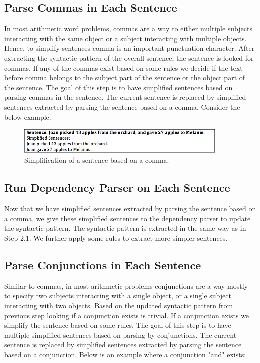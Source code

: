 \documentclass[11pt]{article}
\begin{document}
\subsection{Parse Commas in Each Sentence}
In most arithmetic word problems, commas are a way to either multiple subjects interacting with the same object or a subject interacting with multiple objects. Hence, to simplify sentences comma is an important punctuation character. After extracting the syntactic pattern of the overall sentence, the sentence is looked for commas. If any of the commas exist based on some rules we decide if the text before comma belongs to the subject part of the sentence or the object part of the sentence. The goal of this step is to have simplified sentences based on parsing commas in the sentence. The current sentence is replaced by simplified sentences extracted by parsing the sentence based on a comma. Consider the below example:

\begin{figure}[h]
\includegraphics[width=0.90\textwidth]{Figure3}
\centering
\caption{\label{fig:Figure3}Simplification of a sentence based on a comma.}
\end{figure}

\subsection{Run Dependency Parser on Each Sentence}
Now that we have simplified sentences extracted by parsing the sentence based on a comma, we give these simplified sentences to the dependency parser to update the syntactic pattern. The syntactic pattern is extracted in the same way as in Step 2.1. We further apply some rules to extract more simpler sentences.

\subsection{Parse Conjunctions in Each Sentence}
Similar to commas, in most arithmetic problems conjunctions are a way mostly to specify two subjects interacting with a single object, or a single subject interacting with two objects. Based on the updated syntactic pattern from previous step looking if a conjunction exists is trivial. If a conjunction exists we simplify the sentence based on some rules. The goal of this step is to have multiple simplified sentences based on parsing by conjunctions. The current sentence is replaced by simplified sentences extracted by parsing the sentence based on a conjunction. Below is an example where a conjunction "and" exists:
\end{document}
